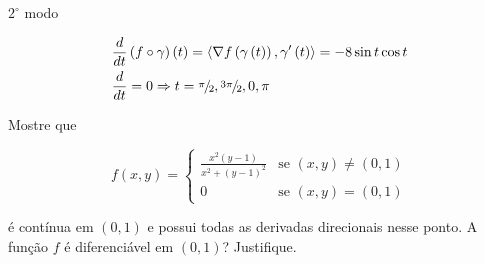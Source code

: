 \documentclass{book}
\begin{document}
\begin{sol}
\begin{enumerate}[(a)]
{$2^\circ$ modo}

\[
\begin{gathered}
  \frac{d}
{{dt}}\left( {f \circ \gamma } \right)\left( t \right) = \left\langle {\nabla f\left( {\gamma \left( t \right)} \right),\gamma '\left( t \right)} \right\rangle  =  - 8\sin t\cos t \hfill \\
  \frac{d}
{{dt}} = 0 \Rightarrow t = {\raise0.5ex\hbox{$\scriptstyle \pi $}
\kern-0.1em/\kern-0.15em
\lower0.25ex\hbox{$\scriptstyle 2$}},{\raise0.5ex\hbox{$\scriptstyle {3\pi }$}
\kern-0.1em/\kern-0.15em
\lower0.25ex\hbox{$\scriptstyle 2$}},0,\pi  \hfill \\
\end{gathered}
\]


\end{enumerate}
\end{sol}

\item Mostre que

\begin{equation*}
f(x,y) = \left\{ \begin{array}{cl}\displaystyle
        \frac{{x^2(y-1)}}{{x^2 + (y-1)^2}} & \textrm{se }\left( {x,y} \right) \ne \left( {0,1} \right)\\
        0 & \textrm{se }\left( {x,y} \right) = \left( {0,1} \right)\end{array}\right.
\end{equation*}

\'e cont\'inua em $(0,1)$ e possui todas as derivadas direcionais nesse ponto. A fun\c{c}\~ao $f$ \'e diferenci\'avel em $(0,1)$? Justifique.
\end{document}

